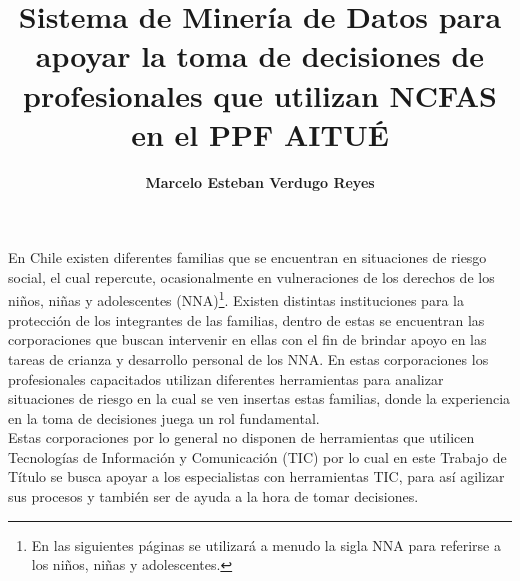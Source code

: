 \documentclass[12pt,letterpaper]{report}
\begin{document}
\title{\textbf{Sistema de Minería de Datos para apoyar la toma de decisiones de profesionales que utilizan NCFAS en el PPF AITUÉ}}
\author{\textbf{Marcelo Esteban Verdugo Reyes}}

\beforepreface
{}
En Chile existen diferentes familias que se encuentran en situaciones de riesgo social, el cual repercute, ocasionalmente en vulneraciones de los derechos de los niños, niñas y adolescentes (NNA)\footnote{En las siguientes páginas se utilizará a menudo la sigla NNA para referirse a los niños, niñas y adolescentes.}. Existen distintas instituciones para la protección de los integrantes de las familias, dentro de estas se encuentran las corporaciones que buscan intervenir en ellas con el fin de brindar apoyo en las tareas de crianza y desarrollo personal de los NNA. 
En estas corporaciones los profesionales capacitados utilizan diferentes herramientas para analizar situaciones de riesgo en la cual se ven insertas estas familias, donde la experiencia en la toma de decisiones juega un rol fundamental.\\ 
Estas corporaciones por lo general no disponen de herramientas que utilicen Tecnologías de Informaci\'on y Comunicaci\'on (TIC) por lo cual en este Trabajo de T\'itulo se busca apoyar a los especialistas con herramientas TIC, para as\'i agilizar sus procesos y tambi\'en ser de ayuda a la hora de tomar decisiones.


\renewcommand{\thepage}{\roman{page}}
\tableofcontents
\newpage
\listoftables
\listoffigures
\newpage

\renewcommand{\thepage}{\arabic{page}}



\end{document}
